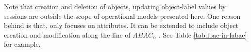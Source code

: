 Note that creation and deletion of objects, updating object-label values by sessions are outside the scope of \eapABAC{} operational models presented here. One reason behind is that, \eapABAC{} only focuses on attributes. It can be extended to include object creation and modification along the line of $ABAC_{\alpha}$ \cite{abacAlpha}. See Table \ref{tab:lbac-in-labac} for example.











